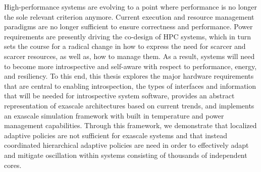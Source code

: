 
High-performance systems are evolving to a point where performance is no longer the sole relevant criterion anymore. Current execution and resource management paradigms are no longer sufficient to ensure correctness and performance. Power requirements are presently driving the co-design of HPC systems, which in turn sets the course for a radical change in how to express the need for scarcer and scarcer resources, as well as, how to manage them. As a result, systems will need to become more introspective and self-aware with respect to performance, energy, and resiliency. To this end, this thesis explores the major hardware requirements that are central to enabling introspection, the types of interfaces and information that will be needed for introspective system software, provides an abstract representation of exascale architectures based on current trends, and implements an exascale simulation framework with built in temperature and power management capabilities. Through this framework, we demonstrate that localized adaptive policies are not sufficient for exascale systems and that instead coordinated hierarchical adaptive policies are need in order to effectively adapt and mitigate oscillation within systems consisting of thousands of independent cores.
